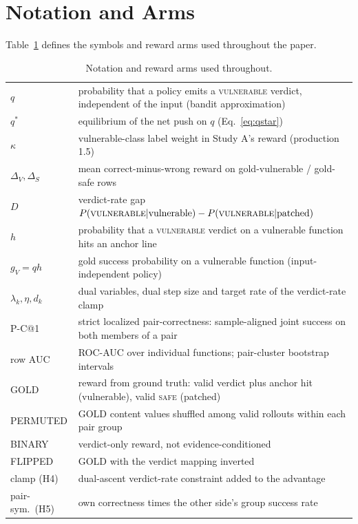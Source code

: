 \documentclass[journal]{IEEEtran}
\makeatletter
\newcommand{\vuln}{\textsc{vulnerable}}
\newcommand{\safe}{\textsc{safe}}
\newcommand{\pc}{P-C@1}
\makeatother
\begin{document}
\section{Notation and Arms}
\label{app:notation}
Table~\ref{tab:notation} defines the symbols and reward arms used throughout the paper.

\begin{table}[!ht]
\centering\scriptsize\setlength{\tabcolsep}{3pt}
\caption{Notation and reward arms used throughout.}
\label{tab:notation}
\begin{tabular}{p{1.9cm}p{6.2cm}}
\toprule
$q$ & probability that a policy emits a \vuln{} verdict, independent of the input (bandit approximation)\\
$q^*$ & equilibrium of the net push on $q$ (Eq.~\ref{eq:qstar})\\
$\kappa$ & vulnerable-class label weight in Study A's reward (production 1.5)\\
$\Delta_V,\Delta_S$ & mean correct-minus-wrong reward on gold-vulnerable / gold-safe rows\\
$D$ & verdict-rate gap $P(\vuln|\text{vulnerable})-P(\vuln|\text{patched})$\\
$h$ & probability that a \vuln{} verdict on a vulnerable function hits an anchor line\\
$g_V=qh$ & gold success probability on a vulnerable function (input-independent policy)\\
$\lambda_k,\eta,d_k$ & dual variables, dual step size and target rate of the verdict-rate clamp\\
\pc{} & strict localized pair-correctness: sample-aligned joint success on both members of a pair\\
row AUC & ROC-AUC over individual functions; pair-cluster bootstrap intervals\\
GOLD & reward from ground truth: valid verdict plus anchor hit (vulnerable), valid \safe{} (patched)\\
PERMUTED & GOLD content values shuffled among valid rollouts within each pair group\\
BINARY & verdict-only reward, not evidence-conditioned\\
FLIPPED & GOLD with the verdict mapping inverted\\
clamp (H4) & dual-ascent verdict-rate constraint added to the advantage\\
pair-sym.\ (H5) & own correctness times the other side's group success rate\\
\bottomrule
\end{tabular}
\end{table}
\end{document}
